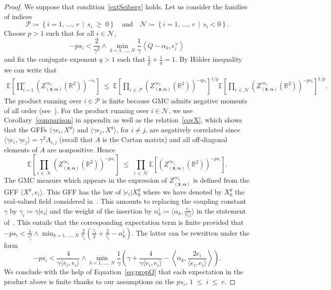 \documentclass[10pt]{amsart}
\theoremstyle{definition}\newtheorem{defi}[theo]{Definition}\newtheorem{rema}[theo]{Remark}\newtheorem{exam}[theo]{Example}\newtheorem{exem}[theo]{Example}\newtheorem{nota}[theo]{Notation}
\renewcommand{\leq}{\;\leqslant\;}
\renewcommand{\geq}{\;\geqslant\;}
\newcommand{\clP}{\mathcal{P}}
\newcommand{\clN}{\mathcal{N}}
\newcommand{\R}{\mathbb{R}}
\newcommand{\E}{\mathbb{E}}
\newcommand{\ps}[1]{\langle #1 \rangle}
\newcommand{\norm}[1]{\left\lvert#1\right\rvert}
\begin{document}
\begin{proof}
We suppose that condition~\eqref{extSeiberg} holds. Let us consider the families of indices
\[
\clP\coloneqq \left\{i=1,\,\dots,\,r\,\middle|\,s_i\geq 0\right\}\quad \text{and}\quad \clN\coloneqq \left\{i=1,\,\dots,\,r\,\middle|\,s_i<0\right\}.
\]
Choose $p>1$ such that for all $i\in \clN$, 
\[
-p s_i< \frac{2}{\gamma^2}\wedge \min\limits_{k=1,\,\dots,\,N} \frac{1}{\gamma}\left\langle Q-\alpha_k,e_i^\vee\right\rangle
\]
and fix the conjugate exponent $q>1$ such that $\tfrac{1}{p}+\tfrac{1}{q}=1$. By H\"older inequality we can write that
\begin{align*}
\E \left [\prod_{i=1}^{r} \left(Z_{\left(\bm z,\bm \alpha\right)}^{\gamma e_i} \left(\R^2\right)\right)^{- s_i} \right] \leq \E \left[\prod_{i\,\in\,\clP} \left(Z_{\left(\bm z,\bm \alpha\right)}^{\gamma e_i} \left(\R^2\right)\right)^{- qs_i} \right]^{1/q} \E \left[\prod_{i\,\in\,\clN} \left(Z_{\left(\bm z,\bm \alpha\right)}^{\gamma e_i} \left(\R^2\right)\right)^{- p s_i} \right]^{1/p}\!.
\end{align*}
The product running over $i\in \clP$ is finite because GMC admits negative moments of all order (see~\cite[Theorem~2.12]{review}). For the product running over $i\in \clN$, we use Corollary~\ref{comparison} in appendix as well as the relation~\eqref{covX}, which shows that the GFFs $\langle \gamma e_i,X^g\rangle$ and $\langle \gamma e_j,X^g\rangle$, for $i\not=j$, are negatively correlated since $\langle \gamma e_i,\gamma e_j\rangle=\gamma ^2A_{i,j}$ (recall that $A$ is the Cartan matrix) and all off-diagonal elements of $A$ are nonpositive. Hence
\begin{equation}\label{ineg1}
\E \left[\prod_{i\,\in\,\clN} \left(Z_{\left(\bm z,\bm \alpha\right)}^{\gamma e_i} \left(\R^2\right)\right)^{- p s_i} \right] \leq \prod_{i\,\in\,\clN} \E \left[\left(Z_{\left(\bm z,\bm \alpha\right)}^{\gamma e_i}\left(\R^2\right)\right)^{- p s_i} \right].
\end{equation}
The GMC measure which appears in the expression of $Z_{(\bm z,\bm \alpha)}^{\gamma e_i}$ is defined from the GFF $\ps{X^g,e_i}$. This GFF has the law of $\norm{e_i}X^g_0$ where we have denoted by $X^g_0$ the real-valued field considered in~\cite[Lemma~A.1]{DKRV}. This amounts to replacing the coupling constant $\gamma$ by $\gamma_i\coloneqq \gamma\norm{e_i}$ and the weight of the insertion by $\alpha_k^i\coloneqq \ps{\alpha_k,\frac{e_i}{\norm{e_i}}}$ in the statement of~\cite[Lemma~A.1]{DKRV}. This entails that the corresponding expectation term is finite provided that $-ps_i < \frac{4}{\gamma_i^2}\wedge \min_{k=1,\,\dots,\,N} \frac{2}{\gamma_i}(\frac{\gamma_i}2+\frac2{\gamma_i}-\alpha_k^i)$. The latter can be rewritten under the form
\[
-ps_i < \frac{4}{\gamma \ps{e_i,e_i}}\wedge \min_{k=1,\,\dots,\,N} \frac{1}{\gamma}\left(\gamma+\frac4{\gamma\ps{e_i,e_i}}-\left\langle\alpha_k,\frac{2e_i}{\ps{e_i,e_i}}\right\rangle\right).
\]
We conclude with the help of Equation~\eqref{eq:propQ} that each expectation in the product above is finite thanks to our assumptions on the $ps_i$, $1\leq i\leq r$.


\end{proof}
\end{document}
